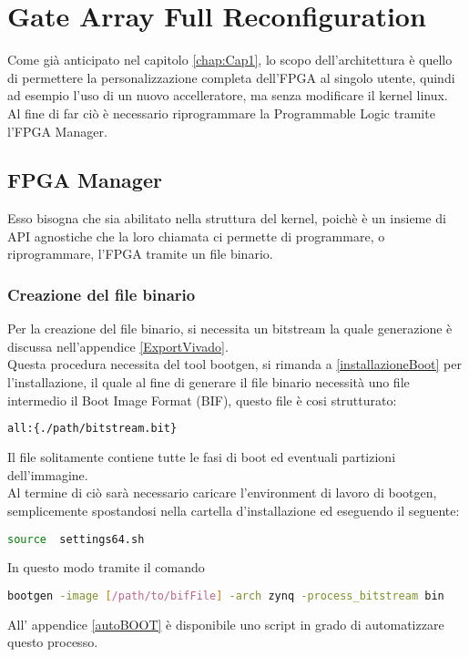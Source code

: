 \chapter{Gate Array Full Reconfiguration}
\label{chap:Cap3}
Come già anticipato nel capitolo \ref{chap:Cap1}, lo scopo dell'architettura è quello di permettere la personalizzazione completa dell'FPGA al singolo utente, quindi ad esempio l'uso di un nuovo accelleratore, ma senza modificare il kernel linux.\\
Al fine di far ciò è necessario riprogrammare la Programmable Logic tramite l'FPGA Manager.
\section{FPGA Manager}
Esso bisogna che sia abilitato nella struttura del kernel, poichè è un insieme di API agnostiche che la loro chiamata ci permette di programmare, o riprogrammare, l'FPGA tramite un file binario.
\subsection{Creazione del file binario}
Per la creazione del file binario, si necessita un bitstream la quale generazione è discussa nell'appendice \ref{ExportVivado}.\\
Questa procedura necessita del tool bootgen, si rimanda a \ref{installazioneBoot} per l'installazione, il quale al fine di generare il file binario necessità uno file intermedio il Boot Image Format (BIF), questo file è cosi strutturato:
\begin{lstlisting}[language=sh, label=lst:C, caption={template file .bif}]
all:{./path/bitstream.bit}
\end{lstlisting}
Il file solitamente contiene tutte le fasi di boot ed eventuali partizioni dell'immagine.\\
Al termine di ciò sarà necessario caricare l'environment di lavoro di bootgen, semplicemente spostandosi nella cartella d'installazione ed eseguendo il seguente:
\begin{lstlisting}[language=sh, label=lst:C, caption={setup environment bootgen}]
source  settings64.sh
\end{lstlisting}
In questo modo tramite il comando 
\begin{lstlisting}[language=sh, label=lst:C, caption={setup environment bootgen}]
bootgen -image [/path/to/bifFile] -arch zynq -process_bitstream bin
\end{lstlisting}
All' appendice \ref{autoBOOT} è disponibile uno script in grado di automatizzare questo processo.
